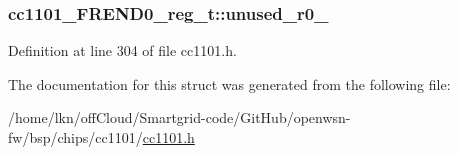 \subsubsection[{\texorpdfstring{unused\+\_\+r0\+\_\+2}{unused_r0_2}}]{ cc1101\+\_\+\+F\+R\+E\+N\+D0\+\_\+reg\+\_\+t\+::unused\+\_\+r0\+\_}\hypertarget{structcc1101___f_r_e_n_d0__reg__t_a7efc837d91f77c310407f31af5a59ac3}{}\label{structcc1101___f_r_e_n_d0__reg__t_a7efc837d91f77c310407f31af5a59ac3}


Definition at line 304 of file cc1101.\+h.



The documentation for this struct was generated from the following file\+:\begin{DoxyCompactItemize}
\item 
/home/lkn/off\+Cloud/\+Smartgrid-\/code/\+Git\+Hub/openwsn-\/fw/bsp/chips/cc1101/\hyperlink{cc1101_8h}{cc1101.\+h}\end{DoxyCompactItemize}
